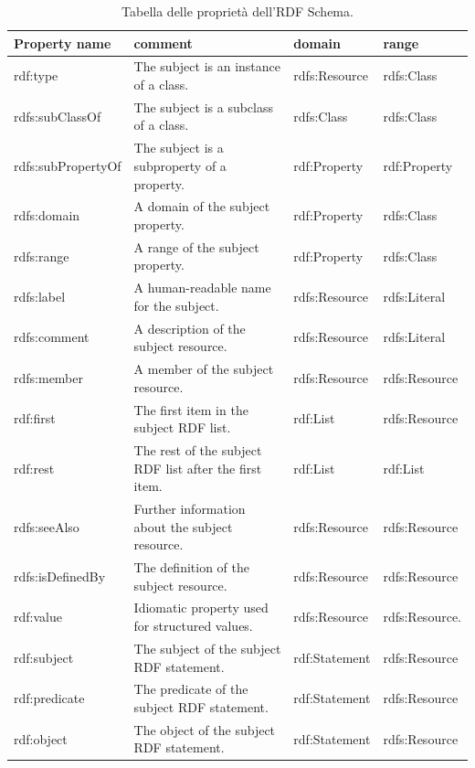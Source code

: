 \documentclass[a4paper,11pt]{article}
\begin{document}
\begin{table}[!htbp]
\begin{center}			
\begin{tabular}{|>{\small}l|>{\small}l|>{\small}l|>{\small}l|}
	\hline \textbf{Property name} & \textbf{comment}	& \textbf{domain} & \textbf{range}\\
	\hline rdf:type & The subject is an instance of a class. & rdfs:Resource &	rdfs:Class\\
	\hline rdfs:subClassOf	& The subject is a subclass of a class. & rdfs:Class &	rdfs:Class\\
	\hline rdfs:subPropertyOf	& The subject is a subproperty of a property.&	rdf:Property & rdf:Property\\
	\hline rdfs:domain & A domain of the subject property.& rdf:Property &	rdfs:Class\\
	\hline rdfs:range & A range of the subject property.&	rdf:Property&rdfs:Class\\
	\hline rdfs:label & A human-readable name for the subject. &	rdfs:Resource &	rdfs:Literal\\
	\hline rdfs:comment& A description of the subject resource.& rdfs:Resource &	rdfs:Literal\\
	\hline rdfs:member & A member of the subject resource. &	rdfs:Resource &	rdfs:Resource\\
	\hline rdf:first & The first item in the subject RDF list. & rdf:List&	rdfs:Resource\\
	\hline rdf:rest & The rest of the subject RDF list after the first item. & rdf:List & rdf:List\\
	\hline rdfs:seeAlso & Further information about the subject resource. & rdfs:Resource & rdfs:Resource\\
	\hline rdfs:isDefinedBy & The definition of the subject resource.	& rdfs:Resource & rdfs:Resource\\
	\hline rdf:value &	Idiomatic property used for structured values.&	rdfs:Resource &	rdfs:Resource.\\
	\hline rdf:subject	& The subject of the subject RDF statement. &	rdf:Statement &	rdfs:Resource\\
	\hline rdf:predicate &	The predicate of the subject RDF statement. &	rdf:Statement &	rdfs:Resource\\
	\hline rdf:object & The object of the subject RDF statement.&	rdf:Statement &	rdfs:Resource\\
	\hline		
\end{tabular}
\caption{Tabella delle proprietà dell'RDF Schema.}	
\end{center}	
\end{table}
\end{document}
